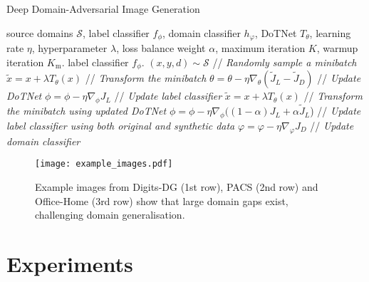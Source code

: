 \documentclass[letterpaper]{article}
\begin{document}
\begin{algorithm}[t]
   \caption{Deep Domain-Adversarial Image Generation}
   \label{alg:our_method}
   \footnotesize
\begin{algorithmic}[1]  source domains $\mathcal{S}$, label classifier $f_\phi$, domain classifier $h_\varphi$, DoTNet $T_\theta$, learning rate $\eta$, hyperparameter $\lambda$, loss balance weight $\alpha$, maximum iteration $K$, warmup iteration $K_\mathrm{m}$.
    label classifier $f_\phi$.
     \STATE $(x, y, d) \sim \mathcal{S}$ \hfill // \textit{Randomly sample a minibatch}
     \STATE $\tilde{x} = x + \lambda T_\theta(x)$ \hfill // \textit{Transform the minibatch}
     \STATE $\theta = \theta - \eta \nabla_\theta (\tilde{J}_L - \tilde{J}_D)$ \hfill // \textit{Update DoTNet}
         \STATE $\phi = \phi - \eta \nabla_\phi J_L$ \hfill // \textit{Update label classifier}
     \ELSE
         \STATE $\tilde{x} = x + \lambda T_\theta(x)$ \hfill // \textit{Transform the minibatch using updated DoTNet}
         \STATE $\phi = \phi - \eta \nabla_\phi ((1 - \alpha) J_L + \alpha \tilde{J}_L$) \hfill // \textit{Update label classifier using both original and synthetic data}
     \ENDIF
     \STATE $\varphi = \varphi - \eta \nabla_\varphi J_D$ \hfill // \textit{Update domain classifier}
   \ENDFOR
\end{algorithmic}
\end{algorithm}



\begin{figure}[t]
    \centering
    \texttt{[image: example\_images.pdf]}
    \caption{\small 
    Example images from Digits-DG (1st row), PACS (2nd row) and Office-Home (3rd row) show that large domain gaps exist, challenging domain generalisation.
    }
    \label{fig:example_images}
    \vspace{-0.4cm}
\end{figure}


\section{Experiments} \label{sec:experiments}
\end{document}
